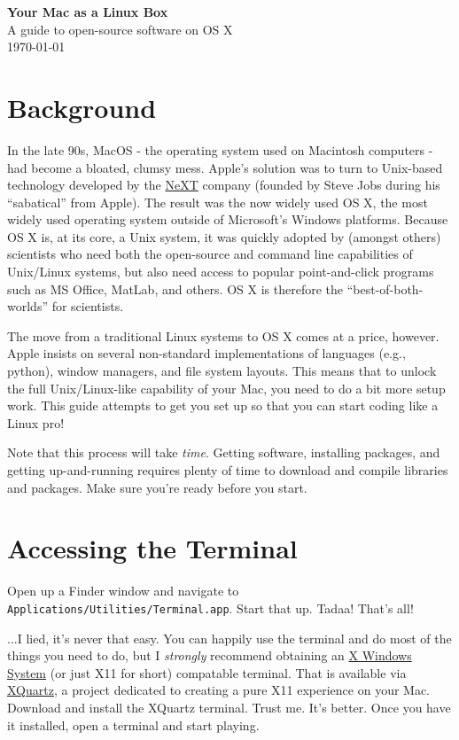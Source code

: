 \documentclass[12pt, letterpaper]{article}
\begin{document}
\begin{center}
  {\LARGE \textbf{Your Mac as a Linux Box}}\\
  {\large A guide to open-source software on OS X}\\
  {\large \today}\\
\end{center}

\section{Background}
In the late 90s, MacOS - the operating system used on Macintosh computers - had
become a bloated, clumsy mess.  Apple's solution was to turn to Unix-based
technology developed by the \href{https://en.wikipedia.org/wiki/NeXT}{NeXT}
company (founded by Steve Jobs during his ``sabatical'' from Apple).
The result was the now widely used OS X, the most widely used operating system
outside of Microsoft's Windows platforms.
Because OS X is, at its core, a Unix system, it was quickly adopted by
(amongst others) scientists who need both the open-source and command line
capabilities of Unix/Linux systems, but also need access to popular
point-and-click programs such as MS Office, MatLab, and others.  OS X is
therefore the ``best-of-both-worlds'' for scientists.

The move from a traditional Linux systems to OS X comes at a price, however.
Apple insists on several non-standard implementations of languages (e.g.,
python), window managers, and file system layouts.  This means that to
unlock the full Unix/Linux-like capability of your Mac, you need to do a bit
more setup work.  This guide attempts to get you set up so that you can start
coding like a Linux pro!

Note that this process will take \emph{time}.  Getting software, installing
packages, and getting up-and-running requires plenty of time to download and
compile libraries and packages.  Make sure you're ready before you start.

\section{Accessing the Terminal}
Open up a Finder window and navigate to
{\tt Applications/Utilities/Terminal.app}.  Start that up.  Tadaa!  That's all!

...I lied, it's never that easy.  You can happily use the terminal and do
most of the things you need to do, but I \emph{strongly} recommend obtaining
an \href{https://en.wikipedia.org/wiki/X_Window_System}{X Windows System}
(or just X11 for short) compatable terminal.  That is available via
\href{http://www.xquartz.org/}{XQuartz}, a project dedicated to creating a
pure X11 experience on your Mac.  Download and install the XQuartz terminal.
Trust me.  It's better.  Once you have it installed, open a terminal and
start playing.
\end{document}
